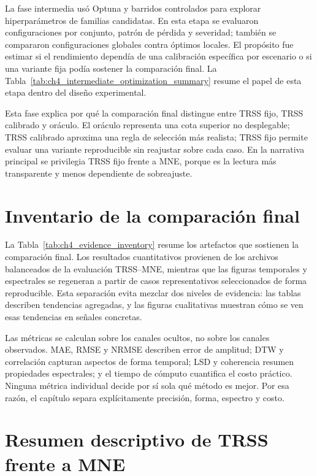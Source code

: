 La fase intermedia usó Optuna y barridos controlados para explorar hiperparámetros de familias candidatas. En esta etapa se evaluaron configuraciones por conjunto, patrón de pérdida y severidad; también se compararon configuraciones globales contra óptimos locales. El propósito fue estimar si el rendimiento dependía de una calibración específica por escenario o si una variante fija podía sostener la comparación final. La Tabla~\ref{tab:ch4_intermediate_optimization_summary} resume el papel de esta etapa dentro del diseño experimental.



Esta fase explica por qué la comparación final distingue entre TRSS fijo, TRSS calibrado y oráculo. El oráculo representa una cota superior no desplegable; TRSS calibrado aproxima una regla de selección más realista; TRSS fijo permite evaluar una variante reproducible sin reajustar sobre cada caso. En la narrativa principal se privilegia TRSS fijo frente a MNE, porque es la lectura más transparente y menos dependiente de sobreajuste.

\section{Inventario de la comparación final}

La Tabla~\ref{tab:ch4_evidence_inventory} resume los artefactos que sostienen la comparación final. Los resultados cuantitativos provienen de los archivos balanceados de la evaluación TRSS--MNE, mientras que las figuras temporales y espectrales se regeneran a partir de casos representativos seleccionados de forma reproducible. Esta separación evita mezclar dos niveles de evidencia: las tablas describen tendencias agregadas, y las figuras cualitativas muestran cómo se ven esas tendencias en señales concretas.



Las métricas se calculan sobre los canales ocultos, no sobre los canales observados. MAE, RMSE y NRMSE describen error de amplitud; DTW y correlación capturan aspectos de forma temporal; LSD y coherencia resumen propiedades espectrales; y el tiempo de cómputo cuantifica el costo práctico. Ninguna métrica individual decide por sí sola qué método es mejor. Por esa razón, el capítulo separa explícitamente precisión, forma, espectro y costo.

\section{Resumen descriptivo de TRSS frente a MNE}

